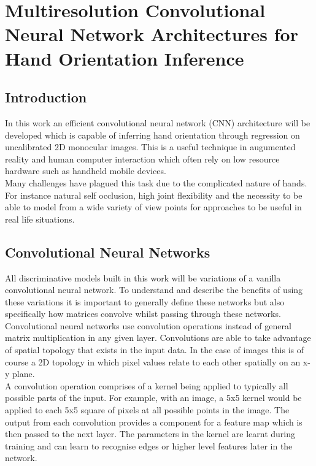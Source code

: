 \documentclass{article}
\begin{document}
\section*{Multiresolution Convolutional Neural Network Architectures for Hand Orientation Inference}

\subsection*{Introduction}
In this work an efficient convolutional neural network (CNN) architecture will be developed which is capable of inferring hand orientation through regression on uncalibrated 2D monocular images. This is a useful technique in augumented reality and human computer interaction which often rely on low resource hardware such as handheld mobile devices.\\

Many challenges have plagued this task due to the complicated nature of hands. For instance natural self occlusion, high joint flexibility and the necessity to be able to model from a wide variety of view points for approaches to be useful in real life situations. \\

\subsection*{Convolutional Neural Networks}
All discriminative models built in this work will be variations of a vanilla convolutional neural network. To understand and describe the benefits of using these variations it is important to generally define these networks but also specifically how matrices convolve whilst passing through these networks.\\

Convolutional neural networks use convolution operations instead of general matrix multiplication in any given layer. Convolutions are able to take advantage of spatial topology that exists in the input data. In the case of images this is of course a 2D topology in which pixel values relate to each other spatially on an x-y plane.\\

A convolution operation comprises of a kernel being applied to  typically all possible parts of the input. For example, with an image, a 5x5 kernel would be applied to each 5x5 square of pixels at all possible points in the image. The output from each convolution provides a component for a feature map which is then passed to the next layer. The parameters in the kernel are learnt during training and can learn to recognise edges or higher level features later in the network.\\
\end{document}
